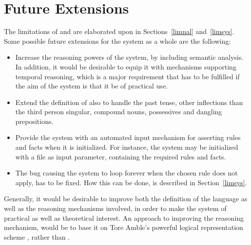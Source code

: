 
\section{Future Extensions}
\label{future}

The limitations of {\nal} and {\nash} are elaborated upon in
Sections~\ref{limnal} and~\ref{limsys}. Some possible future
extensions for the system as a whole are the following:

\begin{itemize}
\item Increase the reasoning powers of the system, by including
  semantic analysis. In addition, it would be desirable to equip it
  with mechanisms supporting temporal reasoning, which is a major
  requirement that has to be fulfilled if the aim of the system is
  that it be of practical use.
\item Extend the definition of {\nal} also to handle the past tense,
  other inflections than the third person singular, compound nouns,
  possessives and dangling prepositions.
\item Provide the system with an automated input mechanism for
  asserting rules and facts when it is initialized. For instance, the
  system may be initialized with a file as input parameter, containing
  the required rules and facts.
\item The bug causing the system to loop forever when the chosen rule
  does not apply, has to be fixed. How this can be done, is described
  in Section~\ref{limsys}.
\end{itemize}
Generally, it would be desirable to improve both the definition of the
language as well as the reasoning mechanisms involved, in order to
make the system of practical as well as theoretical interest. An
approach to improving the reasoning mechanism, would be to base it on
Tore Amble's powerful logical representation scheme {\solon}, rather
than {\niks}.
